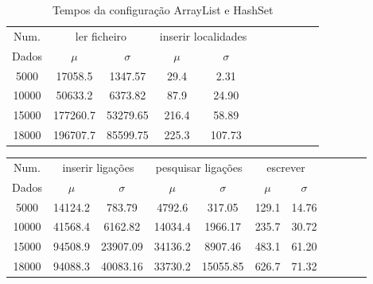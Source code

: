 \documentclass[a5paper,twocolumn, 11pt]{article}
\begin{document}
\clearpage
\onecolumn
\begin{center}
    \begin{table}[h!b!t!]
    \begin{center}
    \caption{Tempos da configuração ArrayList e HashSet}
\begin{tabular}{ | *{11}{c|} }
\hline
    Num. & \multicolumn{2}{|c|}{ler ficheiro} & \multicolumn{2}{|c|}{inserir localidades}\\ %
    
    Dados & $\mu$ & $\sigma$ & $\mu$ & $\sigma$\\ \hline
    5000 & 17058.5 & 1347.57 & 29.4 & 2.31\\ \hline
    10000 & 50633.2 & 6373.82 & 87.9 & 24.90\\ \hline
    15000 & 177260.7 & 53279.65 & 216.4 & 58.89\\ \hline
    18000 & 196707.7 & 85599.75 & 225.3 & 107.73\\ \hline
\end{tabular}
\end{center}
\end{table}
\begin{tabular}{ | *{11}{c|} }
\hline
    Num. & \multicolumn{2}{|c|}{inserir ligações} & \multicolumn{2}{|c|}{pesquisar ligações} & \multicolumn{2}{|c|}{escrever}\\ %
    
    Dados & $\mu$ & $\sigma$ & $\mu$ & $\sigma$ & $\mu$ & $\sigma$\\ \hline
    5000 & 14124.2 & 783.79 & 4792.6 & 317.05 & 129.1 & 14.76\\ \hline
    10000 & 41568.4 & 6162.82 & 14034.4 & 1966.17 & 235.7 & 30.72\\ \hline
    15000 & 94508.9 & 23907.09 & 34136.2 & 8907.46 & 483.1 & 61.20\\ \hline
    18000 & 94088.3 & 40083.16 & 33730.2 & 15055.85 & 626.7 & 71.32\\ \hline
\end{tabular}
\end{center}
\end{document}
